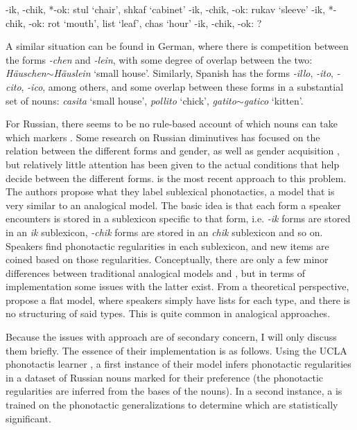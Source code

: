 \begin{exe}
    \ex \label{ikchikok-multiple}
    \begin{xlist}
        \ex -ik, -chik, *-ok: stul `chair', shkaf `cabinet'
        \ex *-ik, -chik, -ok: rukav `sleeve'
        \ex -ik, *-chik, -ok: rot `mouth', list  `leaf', chas `hour'
        \ex -ik, -chik, -ok: ?
    \end{xlist}
\end{exe}

A similar situation can be found in German, where there is competition between the  forms \textit{-chen} and \textit{-lein}, with some degree of overlap between the two: \textit{Häuschen}$\sim$\textit{Häuslein} `small house'. Similarly, Spanish has the forms \textit{-illo}, \textit{-ito}, \textit{-cito}, \textit{-ico}, among others, and some overlap between these forms in a substantial set of nouns: \textit{casita} `small house', \textit{pollito} `chick', \textit{gatito}$\sim$\textit{gatico} `kitten'.

For Russian, there seems to be no rule-based account of which nouns can take which markers \autocite{Gouskova.2015}. Some research on Russian diminutives has focused on the relation between the different forms and gender, as well as gender acquisition \autocites{Kempe.2010, Protassova.2007, Voeykova.1998}, but relatively little attention has been given to the actual conditions that help decide between the different forms. \textcite{Gouskova.2015} is the most recent approach to this problem. The authors propose what they label sublexical phonotactics, a model that is very similar to an analogical model. The basic idea is that each form a speaker encounters is stored in a sublexicon specific to that form, i.e. \textit{-ik} forms are stored in an \textit{ik} sublexicon, \textit{-chik} forms are stored in an \textit{chik} sublexicon and so on. Speakers find phonotactic regularities in each sublexicon, and new items are coined based on those regularities. Conceptually, there are only a few minor differences between traditional analogical models and , but in terms of implementation some issues with the latter exist. From a theoretical perspective, \textcite{Gouskova.2015} propose a flat model, where speakers simply have lists for each type, and there is no structuring of said types. This is quite common in analogical approaches. %

Because the issues with  approach are of secondary concern, I will only discuss them briefly. The essence of their implementation is as follows. Using the UCLA phonotactis learner \autocite{Hayes.2008}, a first instance of their model infers phonotactic regularities in a dataset of Russian nouns marked for their  preference (the phonotactic regularities are inferred from the bases of the nouns). In a second instance, a  is trained on the phonotactic generalizations to determine which are statistically significant.

